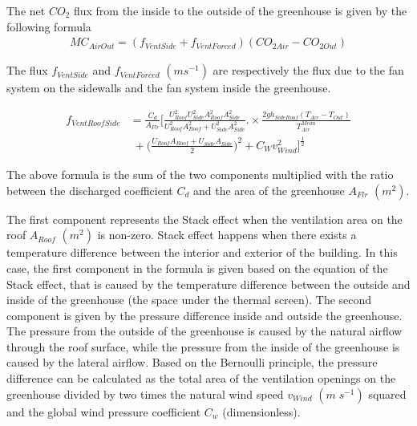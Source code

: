 \documentclass[a4paper]{article}
\begin{document}
The net \(CO_2\) flux from the inside to the outside of the greenhouse is given by the following formula
\begin{gather}
  MC_{AirOut} = (f_{VentSide} + f_{VentForced})(CO_{2 Air} - CO_{2 Out})
\end{gather}

The flux \(f_{VentSide}\) and \(f_{VentForced}\) \((m s^{-1})\) are respectively the flux due to the fan system on the sidewalls and the fan system inside the greenhouse.


\begin{equation} \label{eq:vent_roof_side}
  \begin{split}
    f_{VentRoofSide} & = \frac{C_d}{A_{Flr}} \Bigg[\frac{U^2_{Roof} U^2_{Side} A^2_{Roof} A^2_{Side}}{U^2_{Roof} A^2_{Roof} + U^2_{Side} A^2_{Side}} .\times \frac{2gh_{SideRoof} (T_{Air} - T_{Out})}{T^{Mean}_{Air}} \\
    &\;+ \Bigg(\frac{U_{Roof} A_{Roof} + U_{Side} A_{Side}}{2}\Bigg)^2 + C_W v^2_{Wind} \Bigg]^{\frac{1}{2}}
  \end{split}
\end{equation}

The above formula is the sum of the two components multiplied with the ratio between the discharged coefficient \(C_d\) and the area of the greenhouse \(A_{Flr}\) \((m^2)\).

The first component represents the Stack effect when the ventilation area on the roof \(A_{Roof}\) \((m^2)\) is non-zero. Stack effect happens when there exists a temperature difference between the interior and exterior of the building. In this case, the first component in the formula is given based on the equation of the Stack effect, that is caused by the temperature difference between the outside and inside of the greenhouse (the space under the thermal screen).
The second component is given by the pressure difference inside and outside the greenhouse. The pressure from the outside of the greenhouse is caused by the natural airflow through the roof surface, while the pressure from the inside of the greenhouse is caused by the lateral airflow. Based on the Bernoulli principle, the pressure difference can be calculated as the total area of the ventilation openings on the greenhouse divided by two times the natural wind speed \(v_{Wind}\) \((m\;s^{-1})\) squared and the global wind pressure coefficient \(C_w\) (dimensionless).
\end{document}
